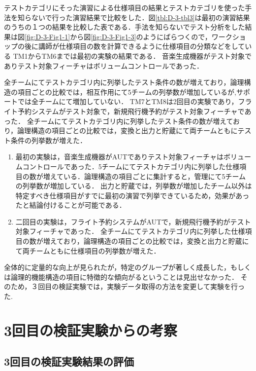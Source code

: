 テストカテゴリにそった演習による仕様項目の結果とテストカテゴリを使った手法を知らないで行った演習結果で比較をした．図\ref{tbl:D-3-tbl3}は最初の演習結果のうちの１つの結果を比較した表である．手法を知らないでテスト分析をした結果は図\ref{fig:D-3-Fig1-1}から図\ref{fig:D-3-Fig1-3}のようにばらつくので，ワークショップの後に講師が仕様項目の数を計算できるように仕様項目の分類などをしている
TM1からTM6までは最初の実験の結果である．
音楽生成機器がテスト対象でありテスト対象フィーチャはボリュームコントロールであった．

全チームにてテストカテゴリ内に列挙したテスト条件の数が増えており，論理構造の項目ごとの比較では，相互作用にて5チームの列挙数が増加しているが,サポートでは全チームにて増加していない．
TM7とTM8は2回目の実験であり，フライト予約システムがテスト対象で，新規飛行機予約がテスト対象フィーチャであった．
全チームにてテストカテゴリ内に列挙したテスト条件の数が増えており，論理構造の項目ごとの比較では，変換と出力と貯蔵にて両チームともにテスト条件の列挙数が増えた．

\begin{enumerate}
\item 最初の実験は，音楽生成機器がAUTでありテスト対象フィーチャはボリュームコントロールであった．5チームにてテストカテゴリ内に列挙した仕様項目の数が増えている．論理構造の項目ごとに集計すると，管理にて5チームの列挙数が増加している． 出力と貯蔵では，列挙数が増加したチーム以外は特定すべき仕様項目がすでに最初の演習で列挙できているため，効果があったと結論付けることが可能である．
\item 二回目の実験は，フライト予約システムがAUTで，新規飛行機予約がテスト対象フィーチャであった． 全チームにてテストカテゴリ内に列挙した仕様項目の数が増えており，論理構造の項目ごとの比較では，変換と出力と貯蔵にて両チームともに仕様項目の列挙数が増えた．
\end{enumerate}

全体的に定量的な向上が見られたが，特定のグループが著しく成長した，もしくは論理的機能構造の項目に特徴的な傾向がるということは見出せなかった．
そのため，３回目の検証実験では，実験データ取得の方法を変更して実験を行った.

\section{3回目の検証実験からの考察}
\subsection{3回目の検証実験結果の評価} \label{sec:3-2}

